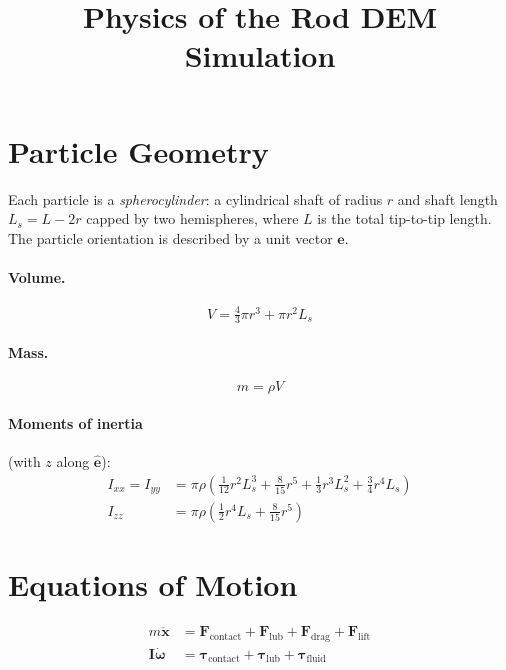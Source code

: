\documentclass[12pt]{article}
\title{Physics of the Rod DEM Simulation}
\date{}
\newcommand{\bs}[1]{\boldsymbol{#1}}
\begin{document}
\maketitle

\section{Particle Geometry}

Each particle is a \textit{spherocylinder}: a cylindrical shaft of radius $r$
and shaft length $L_s = L - 2r$ capped by two hemispheres, where $L$ is the
total tip-to-tip length.  The particle orientation is described by a unit vector
$\hat{\bs{e}}$.

\paragraph{Volume.}
\begin{equation}
  V = \tfrac{4}{3}\pi r^3 + \pi r^2 L_s
\end{equation}

\paragraph{Mass.}
\begin{equation}
  m = \rho V
\end{equation}

\paragraph{Moments of inertia} (with $z$ along $\hat{\bs{e}}$):
\begin{align}
  I_{xx} = I_{yy} &= \pi\rho\!\left(
      \tfrac{1}{12}r^2 L_s^3
    + \tfrac{8}{15}r^5
    + \tfrac{1}{3}r^3 L_s^2
    + \tfrac{3}{4}r^4 L_s
  \right) \\
  I_{zz} &= \pi\rho\!\left(
      \tfrac{1}{2}r^4 L_s
    + \tfrac{8}{15}r^5
  \right)
\end{align}

\section{Equations of Motion}

\begin{align}
  m\ddot{\bs{x}} &= \bs{F}_\text{contact} + \bs{F}_\text{lub}
                   + \bs{F}_\text{drag} + \bs{F}_\text{lift} \\
  \bs{I}\dot{\bs{\omega}} &= \bs{\tau}_\text{contact} + \bs{\tau}_\text{lub}
                            + \bs{\tau}_\text{fluid}
\end{align}
\end{document}
